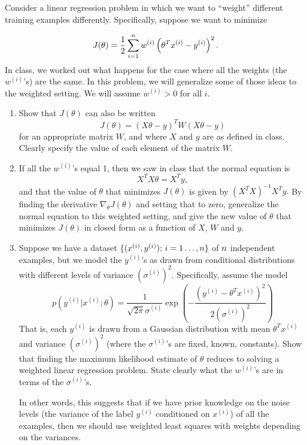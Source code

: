 \item {} Consider a linear regression problem in which
we want to ``weight'' different training examples differently.  Specifically,
suppose we want to minimize
%

\begin{equation*}
	J(\theta) = \frac{1}{2} \sum_{i=1}^{n} w^{(i)}
		\left(\theta^Tx^{(i)} - y^{(i)}\right)^2.
\end{equation*}
%
In class, we worked out what happens for the case where all the weights (the
$w^{(i)}$'s) are the same. In this problem, we will generalize some of those
ideas to the weighted setting. We will assume $w^{(i)} > 0$ for all $i$.

\begin{enumerate}
	\item {} Show that $J(\theta)$ can also be written
    \begin{equation*}
    J(\theta) = (X\theta - {y})^T W (X\theta - {y})
    \end{equation*}
    for an appropriate matrix $W$, and where $X$ and ${y}$ are as
    defined in class. Clearly specify the value of each element of the matrix
    $W$.

	\item \label{item:lwr-solution}  If all the $w^{(i)}$'s
    equal 1, then we saw in class that the normal equation is
    \begin{equation*}
    X^TX\theta = X^T{y},
    \end{equation*}
	and that the value of $\theta$ that minimizes $J(\theta)$ is given by
	$(X^TX)^{-1}X^T{y}.$
	By finding the derivative $\nabla_\theta J(\theta)$ and setting that to zero,
	generalize
	the normal equation to this weighted setting, and give the new value of
	$\theta$ that minimizes
    $J(\theta)$ in closed form as a function of $X$, $W$ and ${y}$.

	\item {} Suppose we have a dataset
	$\{(x^{(i)}, y^{(i)});\, i=1\ldots,{n}\}$ of ${n}$ independent examples, but
    we model the $y^{(i)}$'s as drawn from conditional distributions with
    different levels of variance $(\sigma^{(i)})^2$. Specifically, assume the
    model
    \begin{equation*}
		p(y^{(i)} | x^{(i)} ; \theta) = \frac{1}{\sqrt{2\pi}\sigma^{(i)}} \exp\left(-
		\frac{(y^{(i)} - \theta^Tx^{(i)})^2}{2(\sigma^{(i)})^2}\right)
	\end{equation*}
    That is, each $y^{(i)}$ is drawn from a Gaussian distribution with mean
    $\theta^Tx^{(i)}$ and variance $(\sigma^{(i)})^2$ (where the
    $\sigma^{(i)}$'s are fixed, known, constants). Show that finding the
    maximum likelihood estimate of $\theta$ reduces to solving a weighted
	linear regression problem.  State clearly what the $w^{(i)}$'s are in terms of
    the $\sigma^{(i)}$'s.

	In other words, this suggests that if we have prior knowledge on the noise levels (the variance of the label $y^{(i)}$ conditioned on $x^{(i)}$) of all the examples, then we should use weighted least squares with weights depending on the variances. 
\end{enumerate}
